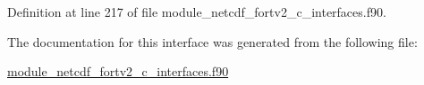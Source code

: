 Definition at line 217 of file module\+\_\+netcdf\+\_\+fortv2\+\_\+c\+\_\+interfaces.\+f90.



The documentation for this interface was generated from the following file\+:\begin{DoxyCompactItemize}
\item 
\hyperlink{module__netcdf__fortv2__c__interfaces_8f90}{module\+\_\+netcdf\+\_\+fortv2\+\_\+c\+\_\+interfaces.\+f90}\end{DoxyCompactItemize}
